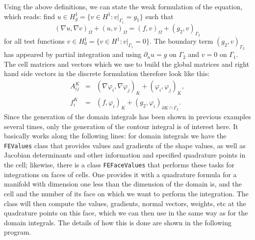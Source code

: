 \documentclass{article}
\begin{document}
Using the above definitions, we can state the weak formulation of the
equation, which reads: find $u\in H^1_g=\{v\in H^1: v|_{\Gamma_1}=g_1\}$ such
that
$$
  {(\nabla u, \nabla v)}_\Omega + {(u,v)}_\Omega
  =
  {(f,v)}_\Omega + {(g_2,v)}_{\Gamma_2}
$$
for all test functions $v\in H^1_0=\{v\in H^1: v|_{\Gamma_1}=0\}$. The
boundary term ${(g_2,v)}_{\Gamma_2}$ has appeared by partial integration and
using $\partial_n u=g$ on $\Gamma_2$ and $v=0$ on $\Gamma_1$. The cell
matrices and vectors which we use to build the global matrices and right hand
side vectors in the discrete formulation therefore look like this:
\begin{eqnarray*}
  A_{ij}^K &=& \left(\nabla \varphi_i, \nabla \varphi_j\right)_K
              +\left(\varphi_i, \varphi_j\right)_K,
  \\
  f_i^K &=& \left(f,\varphi_i\right)_K
           +\left(g_2, \varphi_i\right)_{\partial K\cap \Gamma_2}.
\end{eqnarray*}
Since the generation of the domain integrals has been shown in previous
examples several times, only the generation of the contour integral is of
interest here. It basically works along the following lines: for domain
integrals we have the \texttt{FEValues} class that provides values and
gradients of the shape values, as well as Jacobian determinants and other
information and specified quadrature points in the cell; likewise, there is a
class \texttt{FEFaceValues} that performs these tasks for integrations on
faces of cells. One provides it with a quadrature formula for a manifold with
dimension one less than the dimension of the domain is, and the cell and the
number of its face on which we want to perform the integration. The class will
then compute the values, gradients, normal vectors, weights, etc at the
quadrature points on this face, which we can then use in the same way as for
the domain integrals. The details of how this is done are shown in the
following program.
\end{document}
